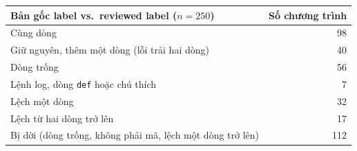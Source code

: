 \begin{tabular}{lr}
\toprule
Bản gốc label vs.\ reviewed label ($n=250$) & Số chương trình \\
\midrule
Cùng dòng & 98 \\
Giữ nguyên, thêm một dòng (lỗi trải hai dòng) & 40 \\
Dòng trống & 56 \\
Lệnh log, dòng \texttt{def} hoặc chú thích & 7 \\
Lệch một dòng & 32 \\
Lệch từ hai dòng trở lên & 17 \\
\midrule
Bị dời (dòng trống, không phải mã, lệch một dòng trở lên) & 112 \\
\bottomrule
\end{tabular}
